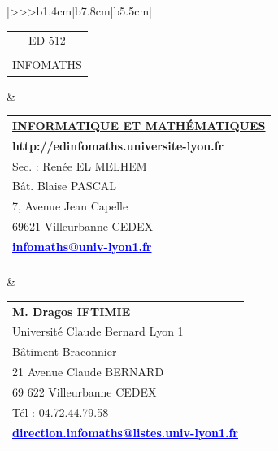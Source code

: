 \begin{center}
\begin{tabular}{|>{\centering}>{}>{\color{txtED}}b{1.4cm}|b{7.8cm}|b{5.5cm}|}
\hline	
	\begin{tabular}{@{}c@{}}
		ED 512\\
		\\
		INFOMATHS\end{tabular}&
	\begin{tabular}{@{}l@{}}
		\\
		\textbf{\underline{INFORMATIQUE ET MATHÉMATIQUES}}\\[.2cm]
		\textcolor{siteED}{\textbf{http://edinfomaths.universite-lyon.fr}}\\
		Sec. : Renée EL MELHEM\\
		Bât. Blaise PASCAL\\
		7, Avenue Jean Capelle\\
		69621 Villeurbanne CEDEX\\
		\textcolor{blue}{\underline{\textbf{infomaths@univ-lyon1.fr}}}\\
		\\
	\end{tabular}&
	\begin{tabular}{@{}l@{}}
		\textcolor{txtED}{\textbf{M. Dragos IFTIMIE}}\\
		Université Claude Bernard Lyon 1\\
		Bâtiment Braconnier\\
		21 Avenue Claude BERNARD\\
		69 622 Villeurbanne CEDEX\\
		Tél : 04.72.44.79.58\\
		\textcolor{blue}{\underline{\textbf{direction.infomaths@listes.univ-lyon1.fr}}}\\
	\end{tabular}\\
		

\end{tabular}
\end{center}
